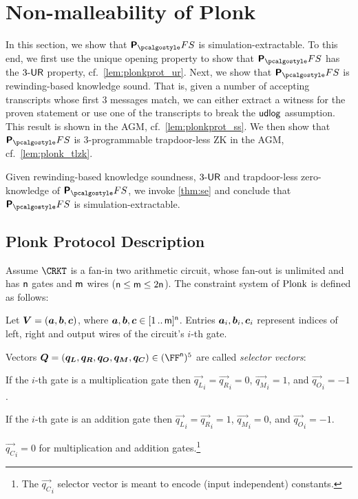 
\section{Non-malleability of Plonk} 
\label{sec:plonk}
In this section, we show that $\plonkprotfs$ is simulation-extractable. To this end, we first use the unique opening property to show that
$\plonkprotfs$ has the ${3\text{-}\mathsf{UR}}$ property,
cf.~\cref{lem:plonkprot_ur}.
Next, we show that $\plonkprotfs$ is rewinding-based knowledge sound. That is, given a number of accepting transcripts whose first $3$ messages match, we can either extract a witness for the proven statement or use one of the transcripts to break the $\mathsf{udlog}$ assumption. This result is shown in the AGM, cf.~\cref{lem:plonkprot_ss}. We then show that $\plonkprotfs$ is $3$-programmable trapdoor-less ZK in the AGM, cf.~\cref{lem:plonk_tlzk}.

Given rewinding-based knowledge soundness, ${3\text{-}\mathsf{UR}}$ and trapdoor-less zero-knowledge of $\plonkprotfs$, we invoke \cref{thm:se} and conclude that $\plonkprotfs$ is simulation-extractable.

\newcommand{\vql}{\vec{q_{L}}}
\newcommand{\vqr}{\vec{q_{R}}}
\newcommand{\vqm}{\vec{q_{M}}}
\newcommand{\vqo}{\vec{q_{O}}}
\newcommand{\vx}{\vec{x}}
\newcommand{\vqc}{\vec{q_{C}}}

\subsection{Plonk Protocol Description}
\label{sec:plonk_explained}
Assume $\CRKT$ is a fan-in two arithmetic circuit, whose
fan-out is unlimited and has $\mathsf{n}$ gates and $\mathsf{m}$ wires
($\mathsf{n} \leq \mathsf{m} \leq 2\mathsf{n}$). The constraint
system of $\textnormal{{Plonk}}$ is defined as follows:
\begin{compactitem}
\item Let $\vec{V} = (\va, \vb, \vc)$, where $\va, \vb, \vc
  \in \range{1}{\noofw}^\numberofconstrains$. Entries $\va_i, \vb_i, \vc_i$ represent indices of left,
  right and output wires of the circuit's $i$-th gate.
\item Vectors $\vec{Q} = (\vql, \vqr, \vqo, \vqm, \vqc) \in
  (\FF^\numberofconstrains)^5$ are called \emph{selector vectors}:
  \begin{inparaenum}[(a)]
  \item If the $i$-th gate is a multiplication gate then $\vql_i = \vqr_i = 0$,
    $\vqm_i = 1$, and $\vqo_i = -1$. 
  \item If the $i$-th gate is an addition gate then $\vql_i = \vqr_i  = 1$, $\vqm_i =
    0$, and $\vqo_i = -1$. 
  \item $\vqc_i = 0$ for multiplication and addition gates.\footnote{The $\vqc_i$ selector vector is meant to encode (input independent) constants.} 
  \end{inparaenum}
\end{compactitem}


